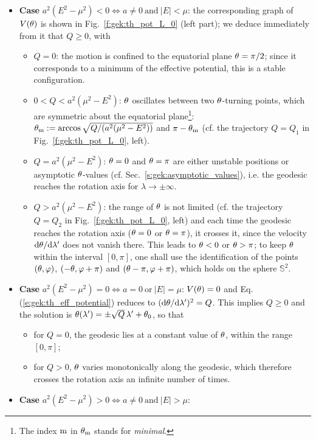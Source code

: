 \begin{itemize}
\item \textbf{Case} $a^2 (E^2 - \mu^2) < 0 \iff a\neq 0 \ \mbox{and}\ |E| < \mu$:
the corresponding graph of $V(\theta)$ is shown in
Fig.~\ref{f:gek:th_pot_L_0} (left part); we deduce immediately from it that
$Q\geq 0$, with
\begin{itemize}
\item $Q=0$: the motion is confined to the equatorial
plane $\theta=\pi/2$; since it corresponds to a minimum of the effective potential, this
is a stable configuration.
\item $0<Q< a^2(\mu^2 - E^2)$: $\theta$ oscillates between
two $\theta$-turning points, which are symmetric about the equatorial plane\footnote{The index ${\rm m}$
in $\theta_{\rm m}$ stands for \emph{minimal}.}:
$\theta_{\rm m} := \arccos\sqrt{Q/(a^2(\mu^2 - E^2))}$
and $\pi-\theta_{\rm m}$ (cf. the trajectory $Q=Q_1$ in Fig.~\ref{f:gek:th_pot_L_0}, left).
\item $Q = a^2(\mu^2 - E^2)$: $\theta=0$ and $\theta=\pi$
are either unstable positions or
asymptotic $\theta$-values (cf. Sec.~\ref{s:gek:asymptotic_values}), i.e.
the geodesic reaches the rotation axis for $\lambda\to\pm\infty$.
\item $Q > a^2(\mu^2 - E^2)$:
the range of $\theta$ is not limited (cf. the trajectory $Q=Q_2$ in Fig.~\ref{f:gek:th_pot_L_0}, left)
and each time the geodesic reaches the
rotation axis ($\theta=0$ or $\theta=\pi$),
it crosses it, since the velocity $\mathrm{d}\theta / \mathrm{d}\lambda'$
does not vanish there. This leads to $\theta < 0$ or $\theta > \pi$; to keep $\theta$
within the interval $[0,\pi]$, one shall use the identification
of the points $(\theta, \varphi)$, $(-\theta, \varphi+\pi)$ and $(\theta-\pi, \varphi+\pi)$,
which holds on the sphere $\mathbb{S}^2$.
\end{itemize}
\item \textbf{Case} $a^2 (E^2 - \mu^2) = 0 \iff a=0\ \mbox{or}\ |E|=\mu$:
$V(\theta)=0$ and Eq.(\ref{e:gek:th_eff_potential})
reduces to $(\mathrm{d}\theta/\mathrm{d}\lambda')^2 = Q$. This implies $Q\geq 0$
and the solution is $\theta(\lambda') = \pm \sqrt{Q}\, \lambda' + \theta_0$,
so that
\begin{itemize}
\item for $Q=0$, the geodesic lies at a constant value of $\theta$, within the range
$[0,\pi]$;
\item for $Q>0$, $\theta$ varies monotonically along the geodesic, which
therefore crosses the rotation
axis an infinite number of times.
\end{itemize}
\item \textbf{Case} $a^2 (E^2 - \mu^2) > 0 \iff a\neq 0 \ \mbox{and}\  |E|>\mu$:

\end{itemize}
